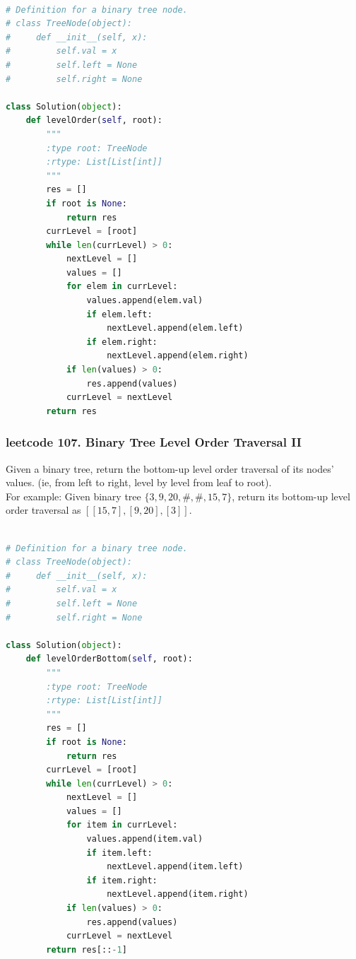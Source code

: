 \documentclass[a4paper,10pt]{article}
\begin{document}
\begin{lstlisting}[language=Python, caption=Problem102. Binary Tree Level Order Traversal]

# Definition for a binary tree node.
# class TreeNode(object):
#     def __init__(self, x):
#         self.val = x
#         self.left = None
#         self.right = None

class Solution(object):
    def levelOrder(self, root):
        """
        :type root: TreeNode
        :rtype: List[List[int]]
        """
        res = []
        if root is None:
            return res
        currLevel = [root]
        while len(currLevel) > 0:
            nextLevel = []
            values = []
            for elem in currLevel:
                values.append(elem.val)
                if elem.left:
                    nextLevel.append(elem.left)
                if elem.right:
                    nextLevel.append(elem.right)
            if len(values) > 0:
                res.append(values)
            currLevel = nextLevel
        return res
\end{lstlisting}



\subsubsection{leetcode 107. Binary Tree Level Order Traversal II}
Given a binary tree, return the bottom-up level order traversal of its nodes' values. (ie, from left to right, level by level from leaf to root). \\

\noindent For example: Given binary tree $\{3,9,20,\#,\#,15,7\}$, return its bottom-up level order traversal as $ [[15,7],[9,20],[3]] $. \\

\begin{lstlisting}[language=Python, caption=Problem107. Binary Tree Level Order Traversal II]

# Definition for a binary tree node.
# class TreeNode(object):
#     def __init__(self, x):
#         self.val = x
#         self.left = None
#         self.right = None

class Solution(object):
    def levelOrderBottom(self, root):
        """
        :type root: TreeNode
        :rtype: List[List[int]]
        """
        res = []
        if root is None:
            return res
        currLevel = [root]
        while len(currLevel) > 0:
            nextLevel = []
            values = []
            for item in currLevel:
                values.append(item.val)
                if item.left: 
                    nextLevel.append(item.left)
                if item.right: 
                    nextLevel.append(item.right)
            if len(values) > 0: 
                res.append(values)
            currLevel = nextLevel
        return res[::-1]
\end{lstlisting}
\end{document}
